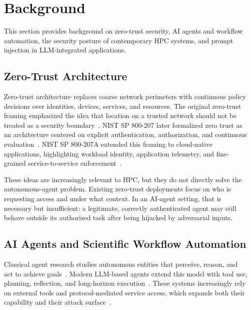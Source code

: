 \section{Background}

This section provides background on zero-trust security, AI agents and workflow automation, the security posture of contemporary HPC systems, and prompt injection in LLM-integrated applications.

\subsection{Zero-Trust Architecture}

Zero-trust architecture replaces coarse network perimeters with continuous policy decisions over identities, devices, services, and resources. The original zero-trust framing emphasized the idea that location on a trusted network should not be treated as a security boundary~\cite{kindervag2010zero}. NIST SP 800-207 later formalized zero trust as an architecture centered on explicit authentication, authorization, and continuous evaluation~\cite{rose2020zta}. NIST SP 800-207A extended this framing to cloud-native applications, highlighting workload identity, application telemetry, and fine-grained service-to-service enforcement~\cite{chandramouli2023zta}.

These ideas are increasingly relevant to HPC, but they do not directly solve the autonomous-agent problem. Existing zero-trust deployments focus on who is requesting access and under what context. In an AI-agent setting, that is necessary but insufficient: a legitimate, correctly authenticated agent may still behave outside its authorized task after being hijacked by adversarial inputs.

\subsection{AI Agents and Scientific Workflow Automation}

Classical agent research studies autonomous entities that perceive, reason, and act to achieve goals~\cite{wooldridge2009agents}. Modern LLM-based agents extend this model with tool use, planning, reflection, and long-horizon execution~\cite{schick2023toolformer,yao2023react,wang2023voyager,mialon2023augmented,xi2023agentsurvey,masterman2024agentsurvey}. These systems increasingly rely on external tools and protocol-mediated service access, which expands both their capability and their attack surface~\cite{mcp2024spec}.

